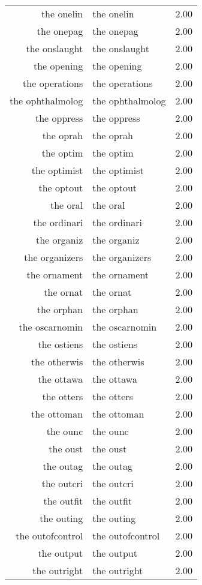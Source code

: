\begin{table}[ht]
\begin{tabular}{rlr}
  the onelin & the onelin & 2.00 \\ 
  the onepag & the onepag & 2.00 \\ 
  the onslaught & the onslaught & 2.00 \\ 
  the opening & the opening & 2.00 \\ 
  the operations & the operations & 2.00 \\ 
  the ophthalmolog & the ophthalmolog & 2.00 \\ 
  the oppress & the oppress & 2.00 \\ 
  the oprah & the oprah & 2.00 \\ 
  the optim & the optim & 2.00 \\ 
  the optimist & the optimist & 2.00 \\ 
  the optout & the optout & 2.00 \\ 
  the oral & the oral & 2.00 \\ 
  the ordinari & the ordinari & 2.00 \\ 
  the organiz & the organiz & 2.00 \\ 
  the organizers & the organizers & 2.00 \\ 
  the ornament & the ornament & 2.00 \\ 
  the ornat & the ornat & 2.00 \\ 
  the orphan & the orphan & 2.00 \\ 
  the oscarnomin & the oscarnomin & 2.00 \\ 
  the ostiens & the ostiens & 2.00 \\ 
  the otherwis & the otherwis & 2.00 \\ 
  the ottawa & the ottawa & 2.00 \\ 
  the otters & the otters & 2.00 \\ 
  the ottoman & the ottoman & 2.00 \\ 
  the ounc & the ounc & 2.00 \\ 
  the oust & the oust & 2.00 \\ 
  the outag & the outag & 2.00 \\ 
  the outcri & the outcri & 2.00 \\ 
  the outfit & the outfit & 2.00 \\ 
  the outing & the outing & 2.00 \\ 
  the outofcontrol & the outofcontrol & 2.00 \\ 
  the output & the output & 2.00 \\ 
  the outright & the outright & 2.00 \\ 

\end{tabular}
\end{table}
